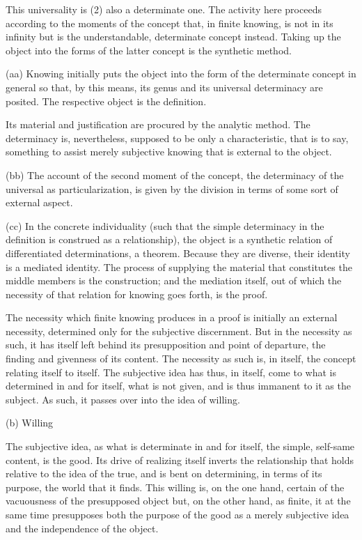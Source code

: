 This universality is
(2) also a determinate one.
The activity here proceeds according to the moments of
the concept that, in finite knowing, is not in its infinity
but is the understandable, determinate concept instead.
Taking up the object into the forms of the latter concept
is the synthetic method.

(aa) Knowing initially puts the object into the form of
the determinate concept in general so that, by this means,
its genus and its universal determinacy are posited.
The respective object is the definition.

Its material and justification are procured by the analytic method.
The determinacy is, nevertheless, supposed to be only a characteristic,
that is to say, something to assist merely subjective knowing
that is external to the object.

(bb) The account of the second moment of the concept,
the determinacy of the universal as particularization,
is given by the division in terms of some sort of external aspect.

(cc) In the concrete individuality
(such that the simple determinacy in the definition
is construed as a relationship),
the object is a synthetic relation of
differentiated determinations, a theorem.
Because they are diverse, their identity is a mediated identity.
The process of supplying the material that constitutes
the middle members is the construction;
and the mediation itself,
out of which the necessity of
that relation for knowing goes forth,
is the proof.

The necessity which finite knowing produces in a proof
is initially an external necessity,
determined only for the subjective discernment.
But in the necessity as such, it has itself left behind
its presupposition and point of departure,
the finding and givenness of its content.
The necessity as such is, in itself,
the concept relating itself to itself.
The subjective idea has thus, in itself,
come to what is determined in and for itself,
what is not given, and is thus immanent to it as the subject.
As such, it passes over into the idea of willing.

(b) Willing

The subjective idea, as what is determinate in and for itself,
the simple, self-same content, is the good.
Its drive of realizing itself inverts the relationship
that holds relative to the idea of the true,
and is bent on determining, in terms of its purpose,
the world that it finds.
This willing is, on the one hand,
certain of the vacuousness of the presupposed object
but, on the other hand, as finite,
it at the same time presupposes
both the purpose of the good as a merely subjective idea
and the independence of the object.

